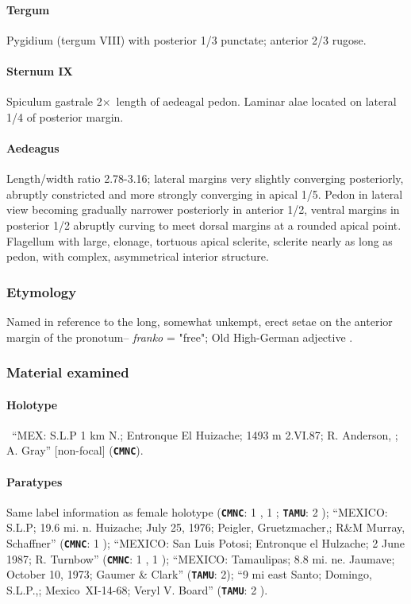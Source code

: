\documentclass[fleqn,10pt,lineno]{wlpeerj} %
\newcommand{\x}{$\times$~}
\begin{document}
			\paragraph{Tergum}
				Pygidium (tergum VIII) with posterior 1/3 punctate; anterior 2/3 rugose.
			\paragraph{Sternum IX}
				Spiculum gastrale 2\x length of aedeagal pedon. Laminar alae located on lateral 1/4 of posterior margin.
			\paragraph{Aedeagus}
				Length/width ratio 2.78-3.16; lateral margins very slightly converging posteriorly, abruptly constricted and more strongly converging in apical 1/5.
				Pedon in lateral view becoming gradually narrower posteriorly in anterior 1/2, ventral margins in posterior 1/2 abruptly curving to meet dorsal margins at a rounded apical point.
				Flagellum with large, elonage, tortuous apical sclerite, sclerite nearly as long as pedon, with complex, asymmetrical interior structure.
		\subsubsection*{Etymology}
			Named in reference to the long, somewhat unkempt, erect setae on the anterior margin of the pronotum-- \textit{franko} = "free"; Old High-German adjective \citep{brown1956}.
		\subsubsection*{Material examined}
			\paragraph{Holotype}
				\female~``MEX: S.L.P 1 km N.; Entronque El Huizache; 1493 m 2.VI.87; R. Anderson, \underline{}; \underline{} A. Gray'' [non-focal] (\texttt{\textbf{CMNC}}).
			\paragraph{Paratypes}
				Same label information as female holotype (\texttt{\textbf{CMNC}}:  1 \female, 1 \male; \texttt{\textbf{TAMU}}: 2 \male);
				``MEXICO: S.L.P; 19.6 mi. n. Huizache; July 25, 1976; Peigler, Gruetzmacher,; R\&M Murray, Schaffner'' (\texttt{\textbf{CMNC}}: 1 \male);
				``MEXICO: San Luis Potosi; Entronque el Hulzache; 2 June 1987; R. Turnbow'' (\texttt{\textbf{CMNC}}: 1 \female, 1 \male);
				``MEXICO: Tamaulipas; 8.8 mi. ne. Jaumave; October 10, 1973; Gaumer \& Clark'' (\texttt{\textbf{TAMU}}: 2\female);
				``9 mi east Santo; Domingo, S.L.P.,; Mexico~XI-14-68; Veryl V. Board'' (\texttt{\textbf{TAMU}}: 2 \male).
\end{document}
